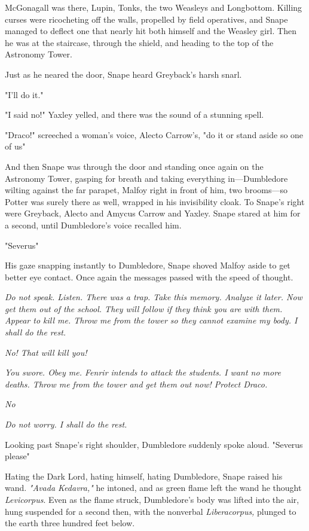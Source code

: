 McGonagall was there, Lupin, Tonks, the two Weasleys and Longbottom. Killing curses were ricocheting off the walls, propelled by field operatives, and Snape managed to deflect one that nearly hit both himself and the Weasley girl. Then he was at the staircase, through the shield, and heading to the top of the Astronomy Tower.

Just as he neared the door, Snape heard Greyback's harsh snarl.

"I'll do it."

"I said no!" Yaxley yelled, and there was the sound of a stunning spell.

"Draco!" screeched a woman's voice, Alecto Carrow's, "do it or stand aside so one of us{\el}"

And then Snape was through the door and standing once again on the Astronomy Tower, gasping for breath and taking everything in—Dumbledore wilting against the far parapet, Malfoy right in front of him, two brooms—so Potter was surely there as well, wrapped in his invisibility cloak. To Snape's right were Greyback, Alecto and Amycus Carrow and{\el} Yaxley. Snape stared at him for a second, until Dumbledore's voice recalled him.

"Severus{\el}"

His gaze snapping instantly to Dumbledore, Snape shoved Malfoy aside to get better eye contact. Once again the messages passed with the speed of thought.

\emph{Do not speak. Listen. There was a trap. Take this memory. Analyze it later. Now get them out of the school. They will follow if they think you are with them. Appear to kill me. Throw me from the tower so they cannot examine my body. I shall do the rest.}

\emph{No! That will kill you!}

\emph{You swore. Obey me. Fenrir intends to attack the students. I want no more deaths. Throw me from the tower and get them out now! Protect Draco.}

\emph{No{\el}}

\emph{Do not worry. I shall do the rest.}

Looking past Snape's right shoulder, Dumbledore suddenly spoke aloud. "Severus{\el} please{\el}"

Hating the Dark Lord, hating himself, hating Dumbledore, Snape raised his wand. \emph{"Avada Kedavra,"} he intoned, and as green flame left the wand he thought \emph{Levicorpus}. Even as the flame struck, Dumbledore's body was lifted into the air, hung suspended for a second then, with the nonverbal \emph{Liberacorpus,} plunged to the earth three hundred feet below.

